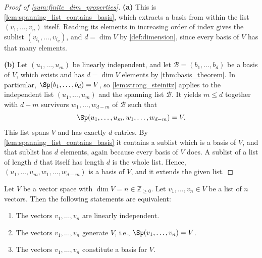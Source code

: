 \begin{proof}[Proof of \cref{sum:finite_dim_properties}]
\textbf{(a)} This is \cref{lem:spanning_list_contains_basis}, which extracts a basis from within the list $(v_1, \dots, v_n)$ itself. Reading its elements in increasing order of index gives the sublist $(v_{i_1}, \dots, v_{i_d})$, and $d = \dim V$ by \cref{def:dimension}, since every basis of $V$ has that many elements.

\textbf{(b)} Let $(u_1, \dots, u_m)$ be linearly independent, and let $\mathcal{B} = (b_1, \dots, b_d)$ be a basis of $V$, which exists and has $d = \dim V$ elements by \cref{thm:basis_theorem}. In particular, $\Sp(b_1, \dots, b_d) = V$, so \cref{lem:strong_steinitz} applies to the independent list $(u_1, \dots, u_m)$ and the spanning list $\mathcal{B}$. It yields $m \le d$ together with $d - m$ survivors $w_1, \dots, w_{d-m}$ of $\mathcal{B}$ such that
\[
\Sp(u_1, \dots, u_m, w_1, \dots, w_{d-m}) = V.
\]
This list spans $V$ and has exactly $d$ entries. By \cref{lem:spanning_list_contains_basis} it contains a sublist which is a basis of $V$, and that sublist has $d$ elements, again because every basis of $V$ does. A sublist of a list of length $d$ that itself has length $d$ is the whole list. Hence, $(u_1, \dots, u_m, w_1, \dots, w_{d-m})$ is a basis of $V$, and it extends the given list.
\end{proof}

\begin{theorem}
\label{thm:basis_equivalent_characterizations}
Let $V$ be a vector space with $\dim V = n \in \mathbb{Z}_{\ge 0}$. Let $v_1, \dots, v_n \in V$ be a list of $n$ vectors. Then the following statements are equivalent:
\begin{enumerate}[label=\textbf{(\alph*)}]
    \item The vectors $v_1, \dots, v_n$ are linearly independent.
    \item The vectors $v_1, \dots, v_n$ generate $V$, i.e., $\Sp(v_1, \dots, v_n) = V$.
    \item The vectors $v_1, \dots, v_n$ constitute a basis for $V$.
\end{enumerate}
\end{theorem}

